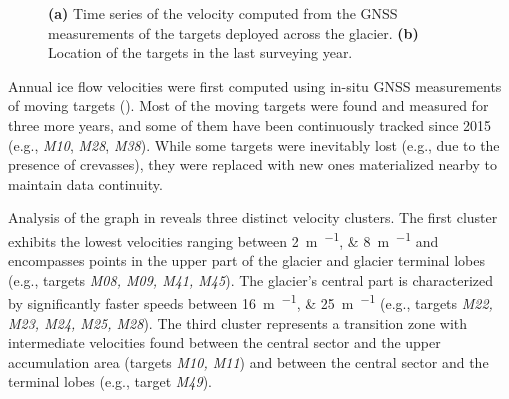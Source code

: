 \begin{figure}[ht!]
    \caption{\textbf{(a)} Time series of the velocity computed from the GNSS measurements of the targets deployed across the glacier. 
    \textbf{(b)} Location of the targets in the last surveying year.}
    \label{fig:3:GNSS_velocity}		
\end{figure}

Annual ice flow velocities were first computed using in-situ GNSS measurements of moving targets ().
Most of the moving targets were found and measured for three more years, and some of them have been continuously tracked since 2015 (e.g., \textit{M10}, \textit{M28}, \textit{M38}). 
While some targets were inevitably lost (e.g., due to the presence of crevasses), they were replaced with new ones materialized nearby to maintain data continuity. 

Analysis of the graph in  reveals three distinct velocity clusters.  
The first cluster exhibits the lowest velocities ranging between \qtylist{2;8}{\meter\per\year} and encompasses points in the upper part of the glacier and glacier terminal lobes (e.g., targets \textit{M08, M09, M41, M45}). 
The glacier's central part is characterized by significantly faster speeds between \qtylist{16;25}{\meter\per\year} (e.g., targets \textit{M22, M23, M24, M25, M28}). 
The third cluster represents a transition zone with intermediate velocities found between the central sector and the upper accumulation area (targets \textit{M10, M11}) and between the central sector and the terminal lobes (e.g., target \textit{M49}).

